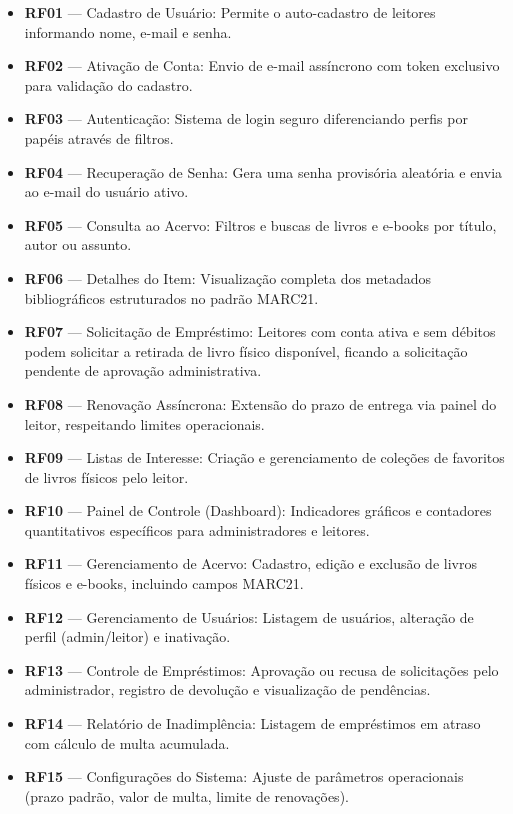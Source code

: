 \begin{itemize}
	\item \textbf{RF01} --- Cadastro de Usuário: Permite o auto-cadastro de leitores informando nome, e-mail e senha.
	\item \textbf{RF02} --- Ativação de Conta: Envio de e-mail assíncrono com token exclusivo para validação do cadastro.
	\item \textbf{RF03} --- Autenticação: Sistema de login seguro diferenciando perfis por papéis através de filtros.
	\item \textbf{RF04} --- Recuperação de Senha: Gera uma senha provisória aleatória e envia ao e-mail do usuário ativo.
	\item \textbf{RF05} --- Consulta ao Acervo: Filtros e buscas de livros e e-books por título, autor ou assunto.
	\item \textbf{RF06} --- Detalhes do Item: Visualização completa dos metadados bibliográficos estruturados no padrão MARC21.
	\item \textbf{RF07} --- Solicitação de Empréstimo: Leitores com conta ativa e sem débitos podem solicitar a retirada de livro físico disponível, ficando a solicitação pendente de aprovação administrativa.
	\item \textbf{RF08} --- Renovação Assíncrona: Extensão do prazo de entrega via painel do leitor, respeitando limites operacionais.
	\item \textbf{RF09} --- Listas de Interesse: Criação e gerenciamento de coleções de favoritos de livros físicos pelo leitor.
	\item \textbf{RF10} --- Painel de Controle (Dashboard): Indicadores gráficos e contadores quantitativos específicos para administradores e leitores.
	\item \textbf{RF11} --- Gerenciamento de Acervo: Cadastro, edição e exclusão de livros físicos e e-books, incluindo campos MARC21.
	\item \textbf{RF12} --- Gerenciamento de Usuários: Listagem de usuários, alteração de perfil (admin/leitor) e inativação.
	\item \textbf{RF13} --- Controle de Empréstimos: Aprovação ou recusa de solicitações pelo administrador, registro de devolução e visualização de pendências.
	\item \textbf{RF14} --- Relatório de Inadimplência: Listagem de empréstimos em atraso com cálculo de multa acumulada.
	\item \textbf{RF15} --- Configurações do Sistema: Ajuste de parâmetros operacionais (prazo padrão, valor de multa, limite de renovações).
\end{itemize}

